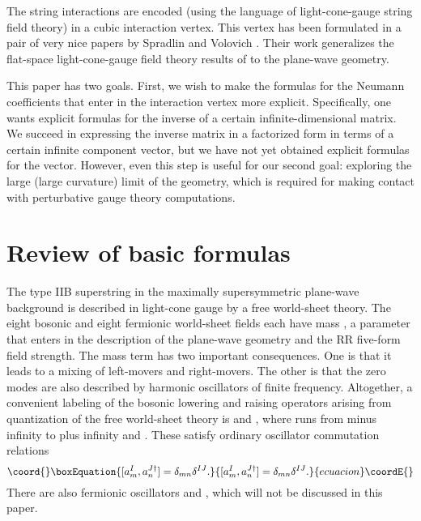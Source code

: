 \documentclass[a4paper,12pt]{article}
\begin{document}
The string interactions are encoded (using the language of
light-cone-gauge string field theory) in a cubic interaction
vertex. This vertex has been formulated in a pair of very nice
papers by Spradlin and Volovich \cite{Spradlin:2002ar}
\cite{Spradlin:2002rv}. Their work generalizes the flat-space
light-cone-gauge field theory results of \cite{Green:1982tc}
\cite{Green:hw} to the plane-wave geometry.

This paper has two goals. First, we wish to make the formulas for
the Neumann coefficients that enter in the interaction vertex more
explicit. Specifically, one wants explicit formulas for the
inverse of a certain infinite-dimensional matrix. We succeed in
expressing the inverse matrix in a factorized form in terms of a
certain infinite component vector, but we have not yet obtained
explicit formulas for the vector. However, even this step is
useful for our second goal: exploring the large \myHighlight{$\mu$}\coordHE{} (large
curvature) limit of the geometry, which is required for making
contact with perturbative gauge theory computations.

\section{Review of basic formulas}

The type IIB superstring in the maximally supersymmetric
plane-wave background is described in light-cone gauge by a free
world-sheet theory. The eight bosonic and eight fermionic
world-sheet fields each have mass \myHighlight{$\mu$}\coordHE{}, a parameter that enters
in the description of the plane-wave geometry and the RR five-form
field strength. The mass term has two important consequences. One
is that it leads to a mixing of left-movers and right-movers. The
other is that the zero modes are also described by harmonic
oscillators of finite frequency. Altogether, a convenient labeling
of the bosonic lowering and raising operators arising from
quantization of the free world-sheet theory is \coordHE{} and \coordHE{}, where \coordHE{} runs from minus infinity to plus infinity and
\coordHE{}. These satisfy ordinary oscillator commutation
relations
\begin{equation}\coord{}\boxEquation{
[a_m^I, a_n^{J \dagger}] = \delta_{mn} \delta^{IJ}.
}{
[a_m^I, a_n^{J \dagger}] = \delta_{mn} \delta^{IJ}.
}{ecuacion}\coordE{}\end{equation}
There are also fermionic oscillators \coordHE{} and
\coordHE{}, which will not be discussed in this paper.
\end{document}
